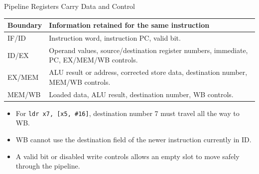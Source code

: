 \documentclass[aspectratio=169,11pt,t]{beamer}
\newcommand{\code}[1]{\texttt{#1}}
\begin{document}
\begin{frame}{Pipeline Registers Carry Data and Control}
\begin{center}
\small
\renewcommand{\arraystretch}{1.28}
\setlength{\tabcolsep}{5pt}
\begin{tabular}{>{\raggedright\arraybackslash}p{3.0cm}>{\raggedright\arraybackslash}p{10.0cm}}
\toprule
\rowcolor{white}
\textbf{Boundary} & \textbf{Information retained for the same instruction} \\
\midrule
IF/ID & Instruction word, instruction PC, valid bit. \\
ID/EX & Operand values, source/destination register numbers, immediate, PC, EX/MEM/WB controls. \\
EX/MEM & ALU result or address, corrected store data, destination number, MEM/WB controls. \\
MEM/WB & Loaded data, ALU result, destination number, WB controls. \\
\bottomrule
\end{tabular}
\end{center}

\begin{itemize}\setlength{\itemsep}{5pt}
  \item For \code{ldr x7, [x5, \#16]}, destination number 7 must travel all the way to WB.
  \item WB cannot use the destination field of the newer instruction currently in ID.
  \item A valid bit or disabled write controls allows an empty slot to move safely through the pipeline.
\end{itemize}

\end{frame}
\end{document}

